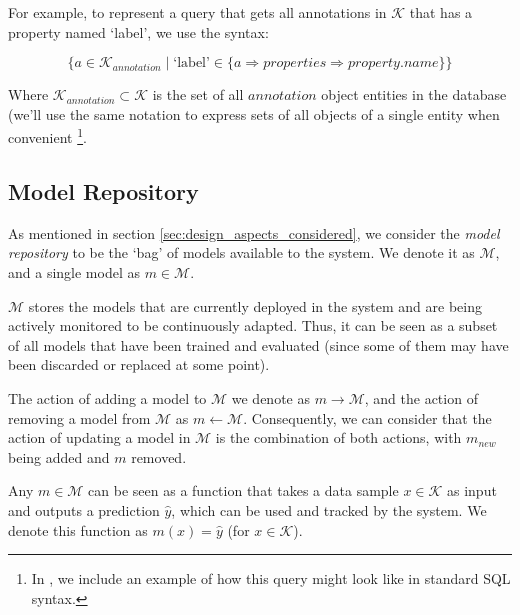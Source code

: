 \documentclass[../main.tex]{subfiles}
\begin{document}
    For example, to represent a query that gets all annotations in $\mathcal{K}$ that has a property named `label', we use the syntax:

    \vspace{-0.35cm}

    \[\{a \in \mathcal{K}_{annotation} \mid \text{`label'} \in \{a \Rightarrow properties \Rightarrow property.name\}\}\]

    \vspace{-0.2cm}

    Where $\mathcal{K}_{annotation}\subset\mathcal{K}$ is the set of all $annotation$ object entities in the database (we'll use the same notation to express sets of all objects of a single entity when convenient  \footnote{In , we include an example of how this query might look like in standard SQL syntax.}.  


    \subsection{Model Repository}

    As mentioned in section \ref{sec:design_aspects_considered}, we consider the \textit{model repository} to be the `bag' of models available to the system. We denote it as $\mathcal{M}$, and a single model as $m \in \mathcal{M}$.
    
    $\mathcal{M}$ stores the models that are currently deployed in the system and are being actively monitored to be continuously adapted. Thus, it can be seen as a subset of all models that have been trained and evaluated (since some of them may have been discarded or replaced at some point).
    
    The action of adding a model to $\mathcal{M}$ we denote as $m \rightarrow \mathcal{M}$, and the action of removing a model from $\mathcal{M}$ as $m \leftarrow \mathcal{M}$. Consequently, we can consider that the action of updating a model in $\mathcal{M}$ is the combination of both actions, with $m_{new}$ being added and $m$ removed.

    Any $m \in \mathcal{M}$ can be seen as a function that takes a data sample $x \in \mathcal{K}$ as input and outputs a prediction $\hat{y}$, which can be used and tracked by the system. We denote this function as $m(x) = \hat{y}$ (for $x \in \mathcal{K}$).
\end{document}
